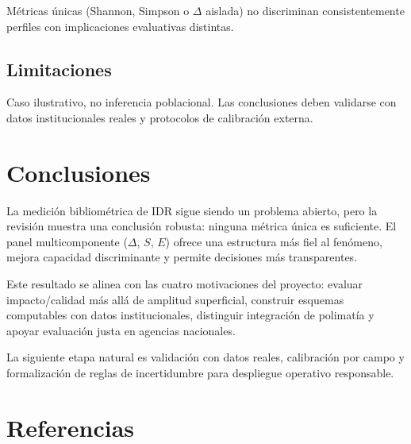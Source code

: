 \documentclass[
]{article}
\begin{document}
Métricas únicas (Shannon, Simpson o \(\Delta\) aislada) no discriminan
consistentemente perfiles con implicaciones evaluativas distintas.

\hypertarget{limitaciones}{%
\subsection{Limitaciones}\label{limitaciones}}

Caso ilustrativo, no inferencia poblacional. Las conclusiones deben
validarse con datos institucionales reales y protocolos de calibración
externa.

\hypertarget{conclusiones}{%
\section{Conclusiones}\label{conclusiones}}

La medición bibliométrica de IDR sigue siendo un problema abierto, pero
la revisión muestra una conclusión robusta: ninguna métrica única es
suficiente. El panel multicomponente (\(\Delta\), \(S\), \(E\)) ofrece
una estructura más fiel al fenómeno, mejora capacidad discriminante y
permite decisiones más transparentes.

Este resultado se alinea con las cuatro motivaciones del proyecto:
evaluar impacto/calidad más allá de amplitud superficial, construir
esquemas computables con datos institucionales, distinguir integración
de polimatía y apoyar evaluación justa en agencias nacionales.

La siguiente etapa natural es validación con datos reales, calibración
por campo y formalización de reglas de incertidumbre para despliegue
operativo responsable.

\hypertarget{referencias}{%
\section{Referencias}\label{referencias}}
\end{document}
